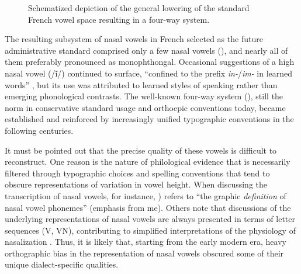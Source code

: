 \documentclass[output=paper,colorlinks,citecolor=brown]{langscibook}
\begin{document}
\begin{figure}
    \caption{Schematized depiction of the general lowering of the standard French vowel space resulting in a four-way system.}
    \label{fig:2}
\end{figure}

The resulting subsystem of nasal vowels in French selected as the future administrative standard  comprised only a few nasal vowels (), and nearly all of them preferably pronounced as monophthongal. Occasional suggestions of a high nasal vowel (/ĩ/) continued to surface, “confined to the prefix \textit{in-}/\textit{im-} in learned words” \citep[][82]{Sampson1999}, but its use was attributed to learned styles of speaking rather than emerging phonological contrasts. The well-known four-way system (), still the norm in conservative standard usage and orthoepic conventions today, became established and reinforced by increasingly unified typographic conventions in the following centuries.

It must be pointed out that the precise quality of these vowels is difficult to reconstruct. One reason is the nature of philological evidence that is necessarily filtered through typographic choices and spelling conventions that tend to obscure representations of variation in vowel height. When discussing the transcription of nasal vowels, for instance, \citet[67]{Hansen1998}) refers to “the graphic \textit{definition} of nasal vowel phonemes” (emphasis from me). Others note that discussions of the underlying representations of nasal vowels are always presented in terms of letter sequences (V, VN), contributing to simplified interpretations of the physiology of nasalization \citep[][236]{Posner1997}. Thus, it is likely that, starting from the early modern era, heavy orthographic bias in the representation of nasal vowels obscured some of their unique dialect-specific qualities.
\end{document}
